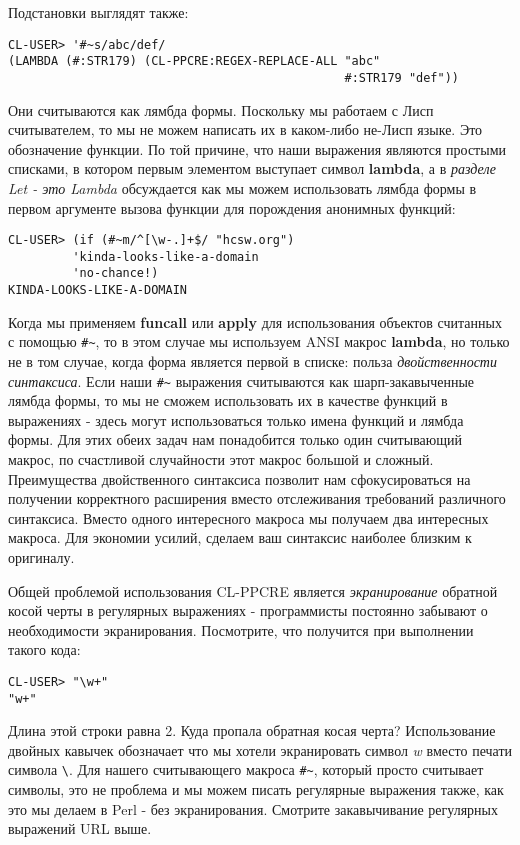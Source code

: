 Подстановки выглядят также:

\begin{verbatim}
CL-USER> '#~s/abc/def/
(LAMBDA (#:STR179) (CL-PPCRE:REGEX-REPLACE-ALL "abc" 
                                               #:STR179 "def"))
\end{verbatim}

Они считываются как лямбда формы. Поскольку мы работаем с Лисп считывателем, то мы не можем написать их в каком-либо не-Лисп языке. Это обозначение функции. По той причине, что наши выражения являются простыми списками, в котором первым элементом выступает символ \textbf{lambda}, а в \emph{разделе Let - это Lambda} обсуждается как мы можем использовать лямбда формы в первом аргументе вызова функции для порождения анонимных функций:

\begin{verbatim}
CL-USER> (if (#~m/^[\w-.]+$/ "hcsw.org")
	     'kinda-looks-like-a-domain
	     'no-chance!)
KINDA-LOOKS-LIKE-A-DOMAIN
\end{verbatim}

Когда мы применяем \textbf{funcall} или \textbf{apply} для использования объектов считанных с помощью \verb"#~", то в этом случае мы используем ANSI макрос \textbf{lambda}, но только не в том случае, когда форма является первой в списке: польза \emph{двойственности синтаксиса}. Если наши \verb"#~" выражения считываются как шарп-закавыченные лямбда формы, то мы не сможем использовать их в качестве функций в выражениях - здесь могут использоваться только имена функций и лямбда формы. Для этих обеих задач нам понадобится только один считывающий макрос, по счастливой случайности этот макрос большой и сложный. Преимущества двойственного синтаксиса позволит нам сфокусироваться на получении корректного расширения вместо отслеживания требований различного синтаксиса. Вместо одного интересного макроса мы получаем два интересных макроса. Для экономии усилий, сделаем ваш синтаксис наиболее близким к оригиналу.

Общей проблемой использования CL-PPCRE является \emph{экранирование} обратной косой черты в регулярных выражениях - программисты постоянно забывают о необходимости экранирования. Посмотрите, что получится при выполнении такого кода:

\begin{verbatim}
CL-USER> "\w+"
"w+"
\end{verbatim}

Длина этой строки равна 2. Куда пропала обратная косая черта? Использование двойных кавычек обозначает что мы хотели экранировать символ \emph{w} вместо печати символа \verb"\". Для нашего считывающего макроса \verb"#~", который просто считывает символы, это не проблема и мы можем писать регулярные выражения также, как это мы делаем в Perl - без экранирования. Смотрите закавычивание регулярных выражений URL выше.

